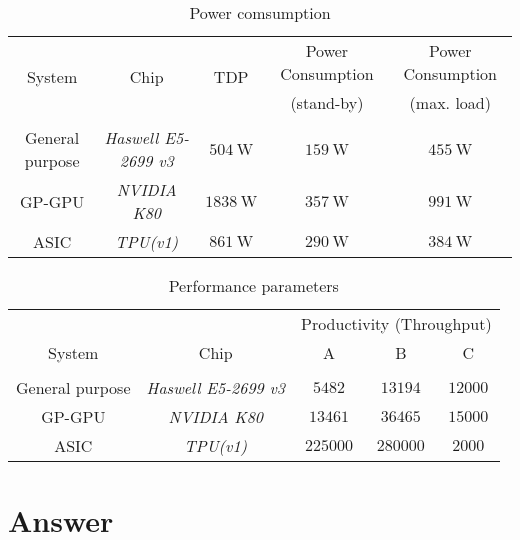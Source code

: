 \documentclass[
    12pt, %
]{fphw}
\begin{document}
\begin{table}[h]
    \footnotesize
    \centering
    \begin{tabular}{c c c c c}
        \multirow{2}{*}{System} & \multirow{2}{*}{Chip} & \multirow{2}{*}{TDP}
            & Power Consumption & Power Consumption \\
        & & & (stand-by) & (max. load) \\
        \hline \hline \\

        General purpose & \textit{Haswell E5-2699 v3} &
            $\SI{504}{\watt}$ & $\SI{159}{\watt}$ & $\SI{455}{\watt}$ \\
        GP-GPU & \textit{NVIDIA K80} &
            $\SI{1838}{\watt}$ & $\SI{357}{\watt}$ & $\SI{991}{\watt}$ \\
        ASIC & \textit{TPU(v1)} &
            $\SI{861}{\watt}$ & $\SI{290}{\watt}$ & $\SI{384}{\watt}$ \\
    \end{tabular}
    \caption{Power comsumption}
    \label{tab:power}
\end{table}

\begin{table}[h]
    \footnotesize
    \centering
    \begin{tabular}{c c c c c}
        & & \multicolumn{3}{c}{Productivity (Throughput)} \\
        System & Chip & A & B & C \\
        \hline \hline \\

        General purpose & \textit{Haswell E5-2699 v3} &
            $5482$ & $13194$ & $12000$ \\
        GP-GPU & \textit{NVIDIA K80} &
            $13461$ & $36465$ & $15000$ \\
        ASIC & \textit{TPU(v1)} &
            $225000$ & $280000$ & $2000$ \\
    \end{tabular}
    \caption{Performance parameters}
    \label{tab:performance}
\end{table}


\newpage

\section*{Answer}
\end{document}
